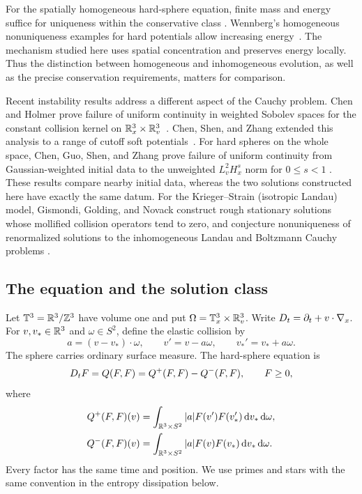 For the spatially homogeneous hard-sphere equation, finite mass and
energy suffice for uniqueness within the conservative class
\cite[Theorem~1.1]{MischlerWennberg1999}. Wennberg's homogeneous
nonuniqueness examples for hard potentials allow increasing
energy~\cite{Wennberg1999}. The mechanism studied here uses spatial
concentration and preserves energy locally. Thus the distinction between
homogeneous and inhomogeneous evolution, as well as the precise
conservation requirements, matters for comparison.

Recent instability results address a different aspect of the Cauchy
problem. Chen and Holmer prove failure of uniform continuity in weighted
Sobolev spaces for the constant collision kernel on
\(\mathbb R^3_x\times\mathbb R^3_v\)~\cite[Theorem~1.3]{ChenHolmer2024}.
Chen, Shen, and Zhang extended this analysis to a range of cutoff soft
potentials~\cite{ChenShenZhang2024}. For hard spheres on the whole space,
Chen, Guo, Shen, and Zhang prove failure of uniform continuity from
Gaussian-weighted initial data to the unweighted \(L^2_vH^s_x\) norm
for \(0\le s<1\)
\cite[Theorem~1.1]{ChenGuoShenZhang2026}. These results compare nearby
initial data, whereas the two solutions constructed here have exactly
the same datum. For the Krieger--Strain (isotropic Landau) model,
Gismondi, Golding, and Novack construct rough stationary solutions whose
mollified collision operators tend to zero, and conjecture nonuniqueness
of renormalized solutions to the inhomogeneous Landau and Boltzmann
Cauchy problems
\cite[Section~1.2]{GismondiGoldingNovack2026}.

\subsection{The equation and the solution class}

Let \(\mathbb T^3=\mathbb R^3/\mathbb Z^3\) have volume one and put
\(\Omega=\mathbb T^3_x\times\mathbb R^3_v\). Write
\(D_t=\partial_t+v\cdot\nabla_x\). For \(v,v_*\in\mathbb R^3\) and
\(\omega\in S^2\), define the elastic collision by
\[
 a=(v-v_*)\cdot\omega,\qquad
 v'=v-a\omega,\qquad v_*'=v_*+a\omega.
\]
The sphere carries ordinary surface measure. The hard-sphere equation is
\begin{equation}\label{eq:collision}
 D_t F=Q(F,F)=Q^+(F,F)-Q^-(F,F),\qquad F\ge0,
\end{equation}
where
\[
\begin{split}
 Q^+(F,F)(v)&=\int_{\mathbb R^3\times S^2}|a|F(v')F(v_*')\,\mathrm d v_*\,\mathrm d\omega,\\
 Q^-(F,F)(v)&=\int_{\mathbb R^3\times S^2}|a|F(v)F(v_*)\,\mathrm d v_*\,\mathrm d\omega.
\end{split}
\]
Every factor has the same time and position. We use primes and stars with
the same convention in the entropy dissipation below.

